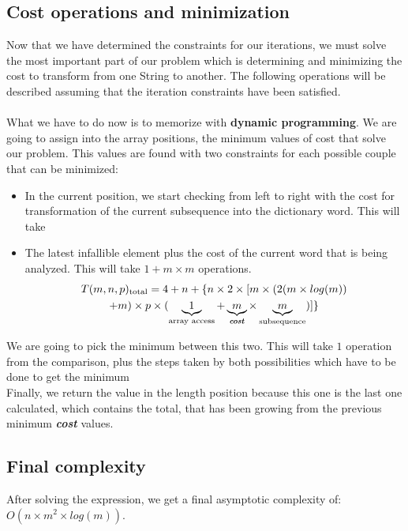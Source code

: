 \documentclass{article}
\begin{document}
	\subsection{Cost operations and minimization}
	Now that we have determined the constraints for our iterations, we
	must solve the most important part of our problem which is determining
	and minimizing the cost to transform from one String to another. The
	following operations will be described assuming that the iteration
	constraints have been satisfied.
	\\
	\\
	What we have to do now is to memorize with \textbf{dynamic programming}.
	We are going to assign into the array positions, the minimum values
	of cost that solve our problem. This values are found with two constraints
	for each possible couple that can be minimized:
	\begin{itemize}
		\item In the current position, we start checking from left to right
		with the cost for transformation of the current subsequence into the
		dictionary word. This will take %
		\item The latest infallible element plus the cost of the current word
		that is being analyzed. This will
		take $1 + m \times m$ operations.
		\begin{multline*}
		T(m, n, p)_\text{total} = 4 + n + \{n \times 2 \times [m \times (2(m \times log(m)) \\ + m) \times p \times (\underbrace{1}_\text{array access} + \underbrace{m}_\text{\emph{\textbf{cost}}} \times \underbrace{m}_\text{subsequence})]\}
		\end{multline*}
	\end{itemize}
	We are going to pick the minimum between this two. This will take $1$ operation
	from the comparison, plus the steps taken by both possibilities which have to be
	done to get the minimum
	\\
	Finally, we return the value in the length position because this one is
	the last one calculated, which contains the total, that has been growing
	from the previous minimum \textbf{\emph{cost}} values.
	\subsection{Final complexity}
	After solving the expression, we get a final asymptotic complexity of: $O(n \times m^2 \times log(m))$.
\end{document}
